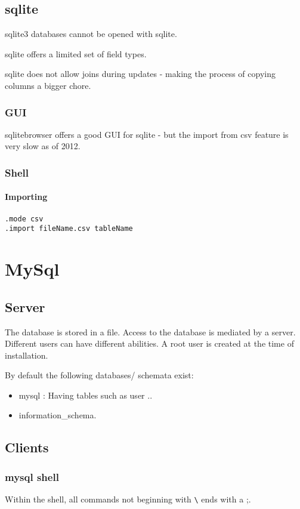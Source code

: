 \documentclass[oneside, article]{memoir}
\begin{document}
\section{sqlite}
sqlite3 databases cannot be opened with sqlite.

sqlite offers a limited set of field types.

sqlite does not allow joins during updates - making the process of copying columns a bigger chore.

\subsection{GUI}
sqlitebrowser offers a good GUI for sqlite - but the import from csv feature is very slow as of 2012.

\subsection{Shell}
\subsubsection{Importing}
\begin{verbatim}
.mode csv
.import fileName.csv tableName
\end{verbatim}




\chapter{MySql}
\section{Server}
The database is stored in a file. Access to the database is mediated by a server. Different users can have different abilities. A root user is created at the time of installation.

By default the following databases/ schemata exist:
\begin{itemize}
 \item mysql : Having tables such as user ..
 \item information\_schema.
\end{itemize}


\section{Clients}
\subsection{mysql shell}
Within the shell, all commands not beginning with \verb'\' ends with a ;.
\end{document}
